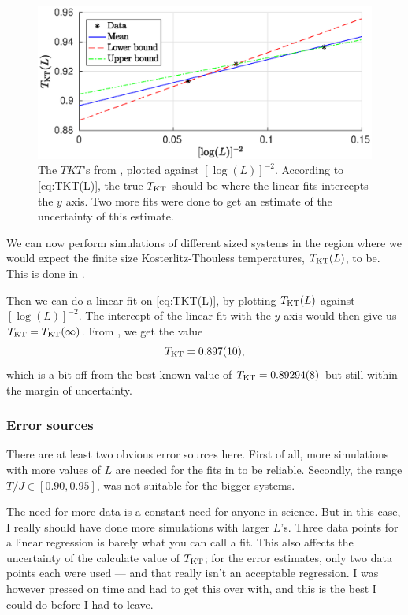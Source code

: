 \documentclass[11pt,letter, swedish, english
]{article}
\begin{document}
\begin{figure}
\centering
\includegraphics[width=1\textwidth]{XY_TKT_L-16--64.eps}
\caption{The $TKT$'s from , plotted against
  $[\log(L)]^{-2}$. According to \eqref{eq:TKT(L)}, the true $T_{\text{KT}}$
  should be where the linear fits intercepts the $y$ axis. Two more
  fits were done to get an estimate of the uncertainty of this
  estimate. } 
\label{fig:TKT}
\end{figure}

We can now perform simulations of different sized systems in the
region where we would expect the finite size Kosterlitz-Thouless
temperatures, $T_{\text{KT}}(L)$, to be. This is done in . 

Then we can do a linear fit on \eqref{eq:TKT(L)}, by plotting
$T_{\text{KT}}(L)$ against $[\log(L)]^{-2}$. The intercept of the linear fit
with the $y$ axis would then give us $T_{\text{KT}}=T_{\text{KT}}(\infty)$. From
, we get the value
\begin{equation*}
T_{\text{KT}} = 0.897(10),
\end{equation*}
which is a bit off from the best known value of $T_{\text{KT}}=0.89294(8)$ but
still within the margin of uncertainty.



\subsubsection{Error sources}
There are at least two obvious error sources here. First of all, more 
simulations with more values of $L$ are needed for the fits in
 to be reliable. Secondly, the range
$T/J\in[0.90,0.95]$, was not suitable for the bigger systems. 

The need for more data is a constant need for anyone in science. But
in this case, I really should have done more simulations with
larger $L$'s. Three data points for a linear regression is barely what
you can call a fit. This also affects the uncertainty of the calculate
value of $T_{\text{KT}}$; for the error estimates, only two data points each
were used --- and that really isn't an acceptable regression.
I was however pressed on time and had to get this over with, and
this is the best I could do before I had to leave. 
\end{document}
